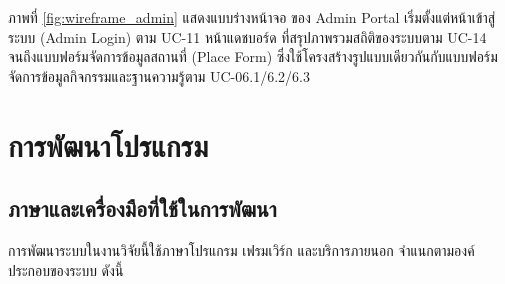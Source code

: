 ภาพที่ \ref{fig:wireframe_admin} แสดงแบบร่างหน้าจอ ของ Admin Portal เริ่มตั้งแต่หน้าเข้าสู่ระบบ (Admin Login) ตาม UC-11 หน้าแดชบอร์ด ที่สรุปภาพรวมสถิติของระบบตาม UC-14 จนถึงแบบฟอร์มจัดการข้อมูลสถานที่ (Place Form) ซึ่งใช้โครงสร้างรูปแบบเดียวกันกับแบบฟอร์มจัดการข้อมูลกิจกรรมและฐานความรู้ตาม UC-06.1/6.2/6.3

\section{การพัฒนาโปรแกรม}

\subsection{ภาษาและเครื่องมือที่ใช้ในการพัฒนา}

การพัฒนาระบบในงานวิจัยนี้ใช้ภาษาโปรแกรม เฟรมเวิร์ก และบริการภายนอก จำแนกตามองค์ประกอบของระบบ ดังนี้

